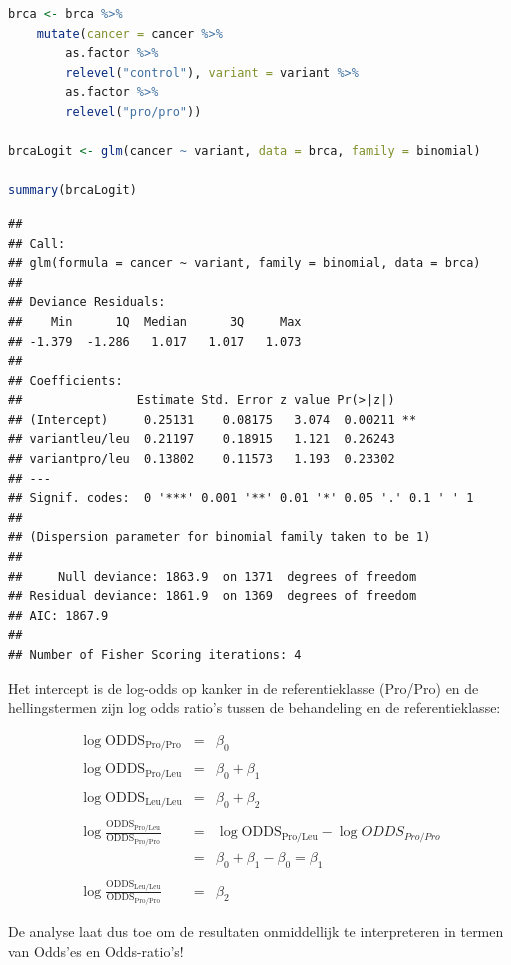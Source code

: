 \documentclass[
  12pt,dutch,coursenotes]{book}
\theoremstyle{definition}
\theoremstyle{definition}
\theoremstyle{definition}
\theoremstyle{definition}
\theoremstyle{remark}
\begin{document}
\begin{lstlisting}[language=R]
brca <- brca %>%
    mutate(cancer = cancer %>%
        as.factor %>%
        relevel("control"), variant = variant %>%
        as.factor %>%
        relevel("pro/pro"))

brcaLogit <- glm(cancer ~ variant, data = brca, family = binomial)

summary(brcaLogit)
\end{lstlisting}

\begin{lstlisting}
## 
## Call:
## glm(formula = cancer ~ variant, family = binomial, data = brca)
## 
## Deviance Residuals: 
##    Min      1Q  Median      3Q     Max  
## -1.379  -1.286   1.017   1.017   1.073  
## 
## Coefficients:
##                Estimate Std. Error z value Pr(>|z|)   
## (Intercept)     0.25131    0.08175   3.074  0.00211 **
## variantleu/leu  0.21197    0.18915   1.121  0.26243   
## variantpro/leu  0.13802    0.11573   1.193  0.23302   
## ---
## Signif. codes:  0 '***' 0.001 '**' 0.01 '*' 0.05 '.' 0.1 ' ' 1
## 
## (Dispersion parameter for binomial family taken to be 1)
## 
##     Null deviance: 1863.9  on 1371  degrees of freedom
## Residual deviance: 1861.9  on 1369  degrees of freedom
## AIC: 1867.9
## 
## Number of Fisher Scoring iterations: 4
\end{lstlisting}

Het intercept is de log-odds op kanker in de referentieklasse (Pro/Pro) en de hellingstermen zijn log odds ratio's tussen de behandeling en de referentieklasse:

\begin{eqnarray*}
\log \text{ODDS}_\text{Pro/Pro}&=&\beta_0\\\\
\log \text{ODDS}_\text{Pro/Leu}&=&\beta_0+\beta_1\\\\
\log \text{ODDS}_\text{Leu/Leu}&=&\beta_0+\beta_2\\\\
\log  \frac{\text{ODDS}_\text{Pro/Leu}}{\text{ODDS}_\text{Pro/Pro}}&=&\log \text{ODDS}_\text{Pro/Leu}-\log ODDS_{Pro/Pro}\\
&=&\beta_0+\beta_1-\beta_0=\beta_1\\\\
\log  \frac{\text{ODDS}_\text{Leu/Leu}}{\text{ODDS}_\text{Pro/Pro}}&=&\beta_2
\end{eqnarray*}

De analyse laat dus toe om de resultaten onmiddellijk te interpreteren in termen van Odds'es en Odds-ratio's!
\end{document}
